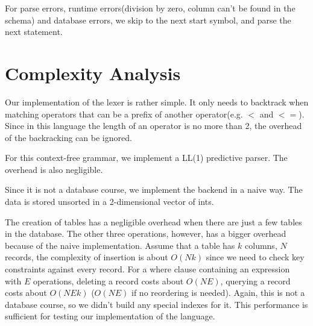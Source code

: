 \documentclass{article}
\begin{document}
For parse errors, runtime errors(division by zero, column can't be found in the schema) and database errors, we skip to the next start symbol, and parse the next statement.

\section{Complexity Analysis}

Our implementation of the lexer is rather simple. It only needs to backtrack when matching operators that can be a prefix of another operator(e.g. $<$ and $<=$). Since in this language the length of an operator is no more than 2, the overhead of the backracking can be ignored.

For this context-free grammar, we implement a LL(1) predictive parser. The overhead is also negligible.

Since it is not a database course, we implement the backend in a naive way. The data is stored unsorted in a 2-dimensional vector of ints.

The creation of tables has a negligible overhead when there are just a few tables in the database. The other three operations, however, has a bigger overhead because of the naive implementation. Assume that a table has $k$ columns, $N$ records, the complexity of insertion is about $O(Nk)$ since we need to check key constraints against every record. For a where clause containing an expression with $E$ operations, deleting a record costs about $O(NE)$, querying a record costs about $O(NEk)$ ($O(NE)$ if no reordering is needed). Again, this is not a database course, so we didn't build any special indexes for it. This performance is sufficient for testing our implementation of the language.
\end{document}
